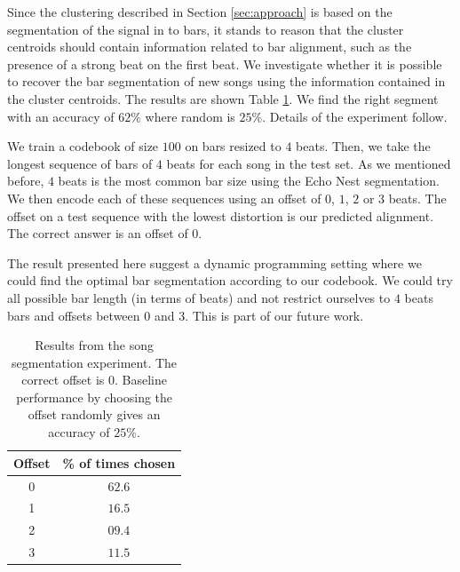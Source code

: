 \documentclass{article}
\begin{document}
Since the clustering described in Section \ref{sec:approach} is based
on the segmentation of the signal in to bars, it stands to reason that
the cluster centroids should contain information related to bar
alignment, such as the presence of a strong beat on the first beat.
%
We investigate whether it is possible to recover the
bar segmentation of new songs using the information contained in the
cluster centroids.  The results are shown Table \ref{tab:offset}. We find
the right segment with an accuracy of $62\%$ where random is
$25\%$. Details of the experiment follow.

We train a codebook of size $100$ on bars resized to $4$ beats. Then,
we take the longest sequence of bars of $4$ beats for each song
in the test set.  As
we mentioned before, $4$ beats is the most common bar size using the
Echo Nest segmentation. We then encode each of these sequences using an offset
of $0$, $1$, $2$ or $3$ beats. The offset on a test sequence
with the lowest distortion is our predicted alignment.
The correct answer is an offset of $0$.


The result presented here suggest a dynamic programming setting where
we could find the optimal bar segmentation according to our codebook. 
We could try
all possible bar length (in terms of beats) and not restrict ourselves
to $4$ beats bars and offsets between $0$ and $3$. This is part of
our future work.

\begin{table}[t]
\begin{center}
\begin{tabular}{cc}
\toprule
Offset & \% of times chosen \\
\midrule
0 & $\mathbf{62.6}$\\
1 & $16.5$\\
2 & $09.4$\\
3 & $11.5$\\
\bottomrule
\end{tabular}
\end{center}
\caption{\small{
Results from the song segmentation experiment.
The correct offset is $0$.
Baseline performance by choosing the offset randomly gives an accuracy of $25$\%.
}}
\label{tab:offset}
\end{table}
\end{document}
